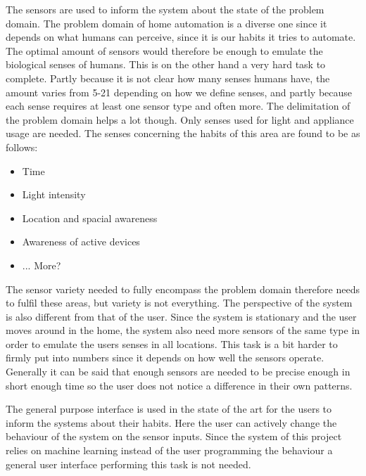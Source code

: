 The sensors are used to inform the system about the state of the problem domain. The problem domain of home automation is a diverse one since it depends on what humans can perceive, since it is our habits it tries to automate. The optimal amount of sensors would therefore be enough to emulate the biological senses of humans. This is on the other hand a very hard task to complete. Partly because it is not clear how many senses humans have, the amount varies from 5-21 depending on how we define senses, and partly because each sense requires at least one sensor type and often more. The delimitation of the problem domain helps a lot though. Only senses used for light and appliance usage are needed. The senses concerning the habits of this area are found to be as follows:
\begin{itemize}
	\item Time
	\item Light intensity
	\item Location and spacial awareness
	\item Awareness of active devices
	\item ... More?
\end{itemize}
The sensor variety needed to fully encompass the problem domain therefore needs to fulfil these areas, but variety is not everything. The perspective of the system is also different from that of the user. Since the system is stationary and the user moves around in the home, the system also need more sensors of the same type in order to emulate the users senses in all locations. This task is a bit harder to firmly put into numbers since it depends on how well the sensors operate. Generally it can be said that enough sensors are needed to be precise enough in short enough time so the user does not notice a difference in their own patterns.

The general purpose interface is used in the state of the art for the users to inform the systems about their habits. Here the user can actively change the behaviour of the system on the sensor inputs. Since the system of this project relies on machine learning instead of the user programming the behaviour a general user interface performing this task is not needed.

